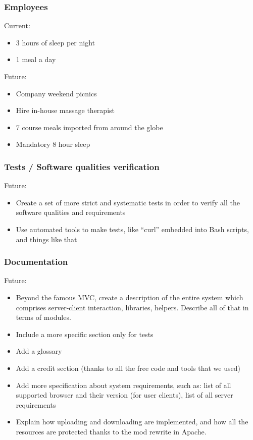 \subsubsection{Employees}
Current:
\begin{itemize}
\item 3 hours of sleep per night
\item 1 meal a day
\end{itemize}
Future:
\begin{itemize}
\item Company weekend picnics
\item Hire in-house massage therapist
\item 7 course meals imported from around the globe
\item Mandatory 8 hour sleep
\end{itemize}

\subsubsection{Tests / Software qualities verification}
Future:
\begin{itemize}
\item Create a set of more strict and systematic tests in order to verify all the software qualities and requirements
\item Use automated tools to make tests, like ``curl'' embedded into Bash scripts, and things like that
\end{itemize}

\subsubsection{Documentation}
Future:
\begin{itemize}
\item Beyond the famous MVC, create a description of the entire system which comprises server-client interaction, libraries, helpers. Describe all of that in terms of modules.
\item Include a more specific section only for tests
\item Add a glossary
\item Add a credit section (thanks to all the free code and tools that we used)
\item Add more specification about system requirements, such as: list of all supported browser and their version (for user clients), list of all server requirements
\item Explain how uploading and downloading are implemented, and how all the resources are protected thanks to the mod rewrite in Apache. 
\end{itemize}
